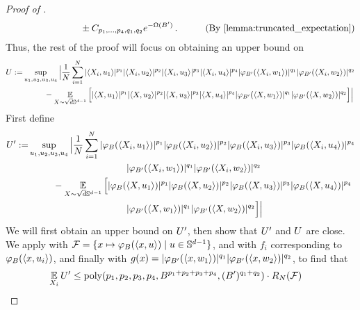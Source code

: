 \begin{proof}[Proof of ]
\begin{align}
& \nextlinespace\nextlinespace\nextlinespace \pm C_{p_1, \ldots, p_4, q_1, q_2} e^{-\Omega(B')} \period
& \tag{By \Cref{lemma:truncated_expectation}}
\end{align}
Thus, the rest of the proof will focus on obtaining an upper bound on 
\begin{align}
U := & \sup_{u_1, u_2, u_3, u_4} \Big|\frac{1}{N} \sum_{i = 1}^N |\langle X_i, u_1 \rangle|^{p_1} |\langle X_i, u_2 \rangle|^{p_2} |\langle X_i, u_3 \rangle|^{p_3} |\langle X_i, u_4 \rangle|^{p_4} |{\varphi_{B'}}(\langle X_i, w_1 \rangle)|^{q_1} |{\varphi_{B'}}(\langle X_i, w_2 \rangle)|^{q_2} \\
& \,\,\,\,\,\,\,\,\,\,\,\,\,\,\,\, - \operatorname*{\mathbb{E}}_{X \sim \sqrt{d} \mathbb{S}^{d - 1}} \Big[|\langle X, u_1 \rangle|^{p_1} |\langle X, u_2 \rangle|^{p_2} |\langle X, u_3 \rangle|^{p_3} |\langle X, u_4 \rangle|^{p_4} |{\varphi_{B'}}(\langle X, w_1 \rangle)|^{q_1} |{\varphi_{B'}}(\langle X, w_2 \rangle)|^{q_2} \Big] \Big|
\end{align}
First define
\begin{align}
{U'} := & \sup_{u_1, u_2, u_3, u_4} \Big|\frac{1}{N} \sum_{i = 1}^N |{\varphi_B}(\langle X_i, u_1 \rangle)|^{p_1} |{\varphi_B}(\langle X_i, u_2 \rangle)|^{p_2} |{\varphi_B}(\langle X_i, u_3 \rangle)|^{p_3} |{\varphi_B}(\langle X_i, u_4 \rangle)|^{p_4} \\
& \,\,\,\,\,\,\,\,\,\,\,\,\,\,\,\,\,\,\,\,\,\,\,\,\,\,\,\,\,\,\,\,\,\,\,\,\,\,\,\,\,\,\,\,\,\,\,\,\,\,\,\,\,\,\,\,\,\,\,\,\,\,\,\, |{\varphi_{B'}}(\langle X_i, w_1 \rangle)|^{q_1} |{\varphi_{B'}}(\langle X_i, w_2 \rangle)|^{q_2} \\
& \,\,\,\,\,\,\,\,\,\,\,\,\,\,\,\, - \operatorname*{\mathbb{E}}_{X \sim \sqrt{d} \mathbb{S}^{d - 1}} \Big[
|{\varphi_B}(\langle X, u_1 \rangle)|^{p_1} |{\varphi_B}(\langle X, u_2 \rangle)|^{p_2} |{\varphi_B}(\langle X, u_3 \rangle)|^{p_3} |{\varphi_B}(\langle X, u_4 \rangle)|^{p_4} \\
& \,\,\,\,\,\,\,\,\,\,\,\,\,\,\,\,\,\,\,\,\,\,\,\,\,\,\,\,\,\,\,\,\,\,\,\,\,\,\,\,\,\,\,\,\,\,\,\,\,\,\,\,\,\,\,\,\,\,\,\,\,\,\,\, |{\varphi_{B'}}(\langle X, w_1 \rangle)|^{q_1} |{\varphi_{B'}}(\langle X, w_2 \rangle)|^{q_2} \Big] \Big|
\end{align}
We will first obtain an upper bound on ${U'}$, then show that ${U'}$ and $U$ are close. We apply  with $\mathcal{F} = \{x \mapsto {\varphi_B}(\langle x, u \rangle) \mid u \in \mathbb{S}^{d - 1}\}$, and with $f_i$ corresponding to ${\varphi_B}(\langle x, u_i \rangle)$, and finally with $g(x) = |{\varphi_{B'}}(\langle x, w_1 \rangle)|^{q_1} |{\varphi_{B'}}(\langle x, w_2 \rangle)|^{q_2}$, to find that
\begin{align}
\E_{X_i} \concBoundTrunc
& \leq \poly(p_1, p_2, p_3, p_4, B^{p_1 + p_2 + p_3 + p_4}, (B')^{q_1 + q_2}) \cdot \RN(\calF) 

\end{align}
\end{proof}
